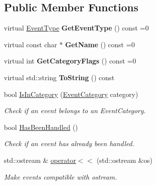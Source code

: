 \subsection*{Public Member Functions}
\begin{DoxyCompactItemize}
\item 
\mbox{\label{classengine_1_1events_1_1Event_a99604df0759386f2cea0071efa52d6e9}} 
virtual \hyperlink{Event_8h_a10b3e1cfc8aaa02ff37fd47f0fae2b8a}{Event\+Type} {\bfseries Get\+Event\+Type} () const =0
\item 
\mbox{\label{classengine_1_1events_1_1Event_a11bf339abb972f3c06f1cf20a0ff894b}} 
virtual const char $\ast$ {\bfseries Get\+Name} () const =0
\item 
\mbox{\label{classengine_1_1events_1_1Event_a24e56efda02b259ac08ecc5ade26963d}} 
virtual int {\bfseries Get\+Category\+Flags} () const =0
\item 
\mbox{\label{classengine_1_1events_1_1Event_afad3baa55387283c7cfe692292edc269}} 
virtual std\+::string {\bfseries To\+String} () const
\item 
bool \hyperlink{classengine_1_1events_1_1Event_abf217454944fb4cceb6dee40d886a0c4}{Is\+In\+Category} (\hyperlink{Event_8h_a1e3bf91397b8a47069494aede2669474}{Event\+Category} category)
\begin{DoxyCompactList}\small\item\em Check if an event belongs to an Event\+Category. \end{DoxyCompactList}\item 
bool \hyperlink{classengine_1_1events_1_1Event_a8d8413f3ea8c3d00b3f43a757a92f623}{Has\+Been\+Handled} ()
\begin{DoxyCompactList}\small\item\em Check if an event has already been handled. \end{DoxyCompactList}\item 
\mbox{\label{classengine_1_1events_1_1Event_aa3b39b29ab7c13070bc033bc88be4152}} 
std\+::ostream \& \hyperlink{classengine_1_1events_1_1Event_aa3b39b29ab7c13070bc033bc88be4152}{operator$<$$<$} (std\+::ostream \&os)
\begin{DoxyCompactList}\small\item\em Make events compatible with ostream. \end{DoxyCompactList}\end{DoxyCompactItemize}
